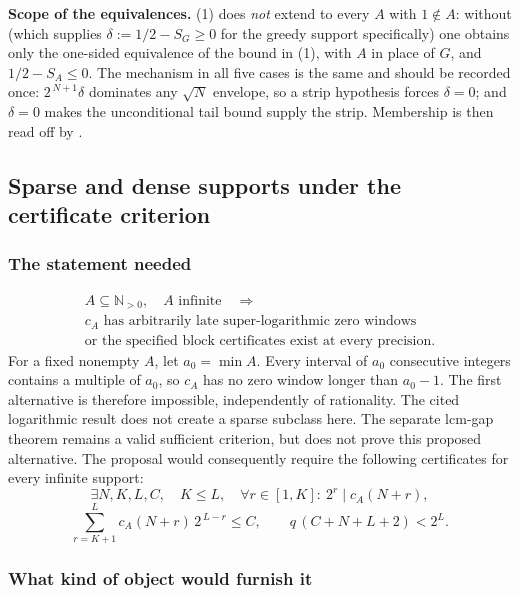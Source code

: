 \textbf{Scope of the equivalences.} (1) does \emph{not} extend to every
$A$ with $1\notin A$: without
 (which supplies
$\delta:=1/2-S_G\ge0$ for the greedy support specifically) one obtains only the one-sided
equivalence of the bound in (1), with $A$ in place of $G$, and $1/2-S_A\le0$. The mechanism in all five cases is the same and
should be recorded once: $2^{\,N+1}\delta$ dominates any $\sqrt{N}$ envelope, so a strip
hypothesis forces $\delta=0$; and $\delta=0$ makes the unconditional tail bound supply the strip.
Membership is then read off by
.

\subsection{Sparse and dense supports under the certificate criterion}
\label{sec:invent-R5}

\subsubsection*{The statement needed}

\[
 \begin{gathered}
 A\subseteq\mathbb N_{>0},\quad A\text{ infinite}\quad\Longrightarrow\\
 \text{$c_A$ has arbitrarily late super-logarithmic zero windows}\\
 \text{or the specified block certificates exist at every precision.}
 \end{gathered}
\]
For a fixed nonempty $A$, let $a_0=\min A$.  Every interval of $a_0$
consecutive integers contains a multiple of $a_0$, so $c_A$ has no zero
window longer than $a_0-1$.  The first alternative is therefore
impossible, independently of rationality.  The cited logarithmic result
does not create a sparse subclass here.  The separate lcm-gap theorem
remains a valid sufficient criterion, but does not prove this proposed
alternative.
The proposal would consequently require the following certificates for
every infinite support:
\[
\exists N,K,L,C,\quad K\le L,\quad
\forall r\in[1,K]:\ 2^{r}\mid c_{A}(N+r),
\]
\[
\sum_{r=K+1}^{L}c_{A}(N+r)\,2^{\,L-r}\le C,
\qquad
q\,(C+N+L+2)<2^{L}.
\]

\subsubsection*{What kind of object would furnish it}

